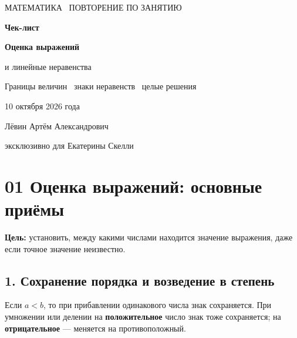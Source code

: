 \documentclass[a4paper,12pt]{article}
\newcommand{\key}[1]{\textbf{\textcolor{darkaccent}{#1}}}
\begin{document}
\thispagestyle{empty}
\begin{center}
\vspace*{27mm}
{\large\color{muted} МАТЕМАТИКА \textbullet\ ПОВТОРЕНИЕ ПО ЗАНЯТИЮ}\par
\vspace{21mm}
{\fontsize{36}{42}\selectfont\bfseries\color{darkaccent} Чек-лист}\par
\vspace{13mm}
{\fontsize{23}{30}\selectfont\bfseries Оценка выражений\par и линейные неравенства}\par
\vspace{14mm}
{\large\color{muted} Границы величин \textbullet\ знаки неравенств \textbullet\ целые решения}\par
\vspace{24mm}
{\large 10 октября 2026 года}\par
\vfill
{\large\color{darkaccent} Лёвин Артём Александрович}\par
\vspace{2mm}
{\large\color{darkaccent} эксклюзивно для Екатерины Скелли}\par
\vspace{11mm}
\end{center}
\clearpage

\section*{01 \quad Оценка выражений: основные приёмы}
\key{Цель:} установить, между какими числами находится значение выражения, даже если точное значение неизвестно.

\subsection*{1. Сохранение порядка и возведение в степень}
Если $a<b$, то при прибавлении одинакового числа знак сохраняется. При умножении или делении на \key{положительное} число знак тоже сохраняется; на \key{отрицательное} --- меняется на противоположный.
\end{document}

